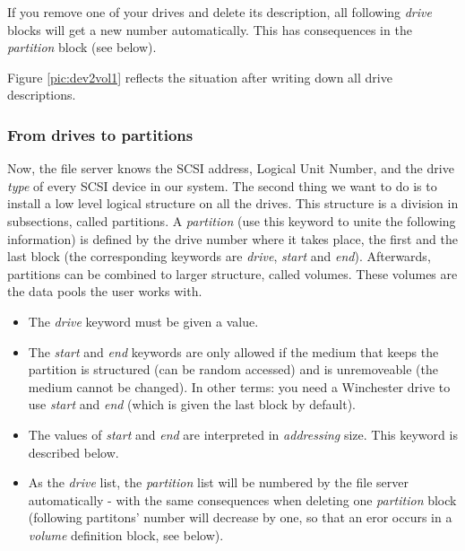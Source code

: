 \begin{note}
  If you remove one of your drives and delete its description, all following
  {\it drive} blocks will get a new number automatically. This has
  consequences in the {\it partition} block (see below).
\end{note}

Figure \ref{pic:dev2vol1} reflects the situation after writing down all drive
descriptions.


\subsubsection{From drives to partitions}

Now, the file server knows the SCSI address, Logical Unit Number, and the
drive {\it type} of every SCSI device in our system. The second thing we want
to do is to install a low level logical structure on all the drives. This
structure is a division in subsections, called partitions. A
{\it partition} (use this keyword to unite
the following information) is defined by the drive number where it takes
place, the first and the last block (the corresponding keywords are
{\it drive}, {\it start} and
{\it end}).
Afterwards, partitions can be combined to larger structure, called volumes.
These volumes are the data pools the user works with.

\begin{note}

  \begin{itemize}

    \item The {\it drive} keyword must be given a value.

    \item The {\it start} and {\it end} keywords are only allowed if the medium that keeps
          the partition is structured (can be random accessed) and is
          unremoveable (the medium cannot be changed). In other terms: you
          need a Winchester drive to use {\it start} and {\it end} (which is given the
          last block by default).

    \item The values of {\it start} and {\it end} are interpreted in {\it addressing} size. This
          keyword is described below.

    \item As the {\it drive} list, the {\it partition} list will be numbered by the
          file server automatically - with the same consequences when deleting
          one {\it partition} block (following partitons' number will decrease by
          one, so that an eror occurs in a {\it volume} definition block, see
          below).

  \end{itemize}

\end{note}

